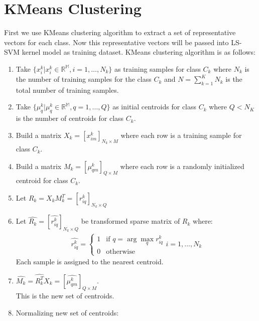 \documentclass[conference]{IEEEtran}
\begin{document}


    \section{KMeans Clustering}\label{sec:kmeans-clustering}
    First we use KMeans clustering algorithm to extract a set of representative vectors for each class.
    Now this representative vectors will be passed into LS-SVM kernel model as training dataset.
    KMeans clustering algorithm is as follows:
    \begin{enumerate}
        \item Take $\{x_{i}^{k}|x_{i}^{k} \in \mathbb{R^{M}}, i=1,\ldots,N_{k}\}$ as training samples for class $C_{k}$ where
        $N_{k}$ is the number of training samples for the class $C_{k}$ and $N = \sum_{k=1}^{K}N_{k}$ is the total
        number of training samples.
        \item Take $\{\mu_{q}^{k}|\mu_{q}^{k} \in \mathbb{R^{M}}, q=1,\ldots,Q \}$ as initial centroids
        for class $C_{k}$ where $Q<N_{K}$ is the number of centroids for class $C_{k}$.
        \item Build a matrix $X_{k} = [x_{im}^{k}]_{N_{k} \times M}$ where each row is a training sample for class $C_{k}$.
        \item Build a matrix $M_{k} = [\mu_{qm}^{k}]_{Q \times M}$ where each row is a randomly initialized centroid
        for class $C_{k}$.
        \item Let $R_{k} = X_{k}M_{k}^{T} = [r_{iq}^{k}]_{N_{k}\times Q}$
        \item Let $\hat{R_{k}} = [\hat{r_{iq}^{k}}]_{N_{k}\times Q}$ be transformed sparse matrix of $R_{k}$ where:
        \begin{align*}
            \hat{r_{iq}^{k}} = \begin{cases}
                                   1 & \text{if } q = \arg \max_{q}r_{iq}^{k} \\
                                   0 & \text{otherwise}
            \end{cases}
            i = 1,\ldots,N_{k}
        \end{align*}
        Each sample is assigned to the nearest centroid.
        \item $\hat{M_{k}} = \hat{R_{k}^{T}}X_{k} = [\hat{\mu_{qm}^{k}}]_{Q \times M}$. \\
        This is the new set of centroids.
        \item Normalizing new set of centroids:

\end{enumerate}
\end{document}
